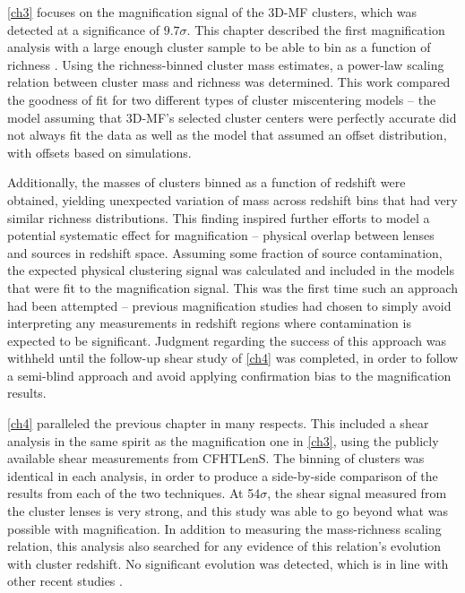 \autoref{ch3} focuses on the magnification signal of the \ac{3D-MF} clusters, which was detected at a significance of $9.7\sigma$. This chapter described the first magnification analysis with a large enough cluster sample to be able to bin as a function of richness \citep[however, note that the publication of this work was followed in quick succession by another magnification study of clusters and luminous red galaxies in the \ac{SDSS} by][]{Bauer14}. Using the richness-binned cluster mass estimates, a power-law scaling relation between cluster mass and richness was determined. This work compared the goodness of fit for two different types of cluster miscentering models -- the model assuming that \ac{3D-MF}'s selected cluster centers were perfectly accurate did not always fit the data as well as the model that assumed an offset distribution, with offsets based on simulations.

Additionally, the masses of clusters binned as a function of redshift were obtained, yielding unexpected variation of mass across redshift bins that had very similar richness distributions. This finding inspired further efforts to model a potential systematic effect for magnification -- physical overlap between lenses and sources in redshift space. Assuming some fraction of source contamination, the expected physical clustering signal was calculated and included in the models that were fit to the magnification signal. This was the first time such an approach had been attempted -- previous magnification studies had chosen to simply avoid interpreting any measurements in redshift regions where contamination is expected to be significant. Judgment regarding the success of this approach was withheld until the follow-up shear study of \autoref{ch4} was completed, in order to follow a semi-blind approach and avoid applying confirmation bias to the magnification results.

\autoref{ch4} paralleled the previous chapter in many respects. This included a shear analysis in the same spirit as the magnification one in \autoref{ch3}, using the publicly available shear measurements from \ac{CFHTLenS}. The binning of clusters was identical in each analysis, in order to produce a side-by-side comparison of the results from each of the two techniques. At 54$\sigma$, the shear signal measured from the cluster lenses is very strong, and this study was able to go beyond what was possible with magnification. In addition to measuring the mass-richness scaling relation, this analysis also searched for any evidence of this relation's evolution with cluster redshift. No significant evolution was detected, which is in line with other recent studies \citep{Andreon14}. 

